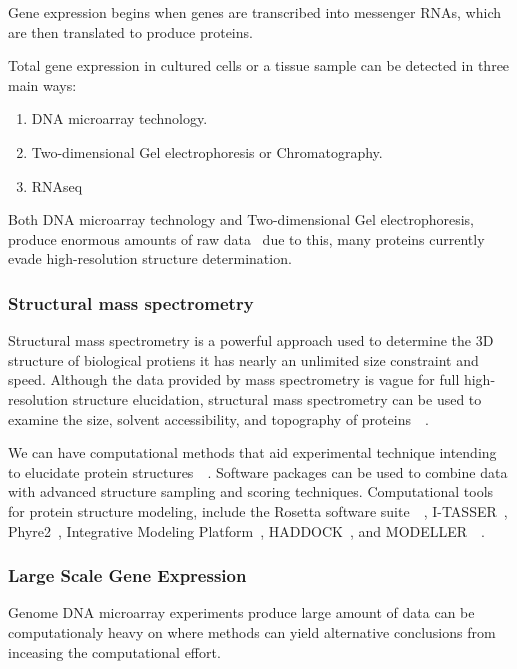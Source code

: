 \documentclass[]{final_report}
\begin{document}
Gene expression begins when genes are transcribed into messenger RNAs, which are then translated to produce proteins. 

Total gene expression in cultured cells or a tissue sample can be detected in three main ways:

\begin{enumerate}
    \item DNA microarray technology.
    \item Two-dimensional Gel electrophoresis or Chromatography.
    \item RNAseq
\end{enumerate}

Both DNA microarray technology and Two-dimensional Gel electrophoresis, produce enormous amounts of raw data~\cite{zvelebil_understanding_2008} due to this, many proteins currently evade high-resolution structure determination.

\subsubsection{Structural mass spectrometry}
Structural mass spectrometry is a powerful approach used to determine the 3D structure of biological protiens it has nearly an unlimited size constraint and speed. Although the data provided by mass spectrometry is vague for full high-resolution structure elucidation, structural mass spectrometry can be used to examine the size, solvent accessibility, and topography of proteins~\cite{limpikirati_covalent_2018}~\cite{liu_mass_2020}.

We can have computational methods that aid experimental technique intending to elucidate protein structures~\cite{seffernick_hybrid_2020}~\cite{leman_macromolecular_2020}. Software packages can be used to combine data with advanced structure sampling and scoring techniques. Computational tools for protein structure modeling, include the Rosetta software suite~\cite{leman_macromolecular_2020}~\cite{alford_rosetta_2017}, I-TASSER~\cite{yang_i-tasser_2015}, Phyre2~\cite{kelley_phyre2_2015}, Integrative Modeling Platform~\cite{russel_putting_2012}, HADDOCK~\cite{dominguez_haddock_2003}, and MODELLER~\cite{eswar_comparative_2006}~\cite{biehn_protein_2022}.

\subsubsection{Large Scale Gene Expression}

Genome DNA microarray experiments produce large amount of data can be computationaly heavy on where methods can yield alternative conclusions from inceasing the computational effort.
\end{document}
